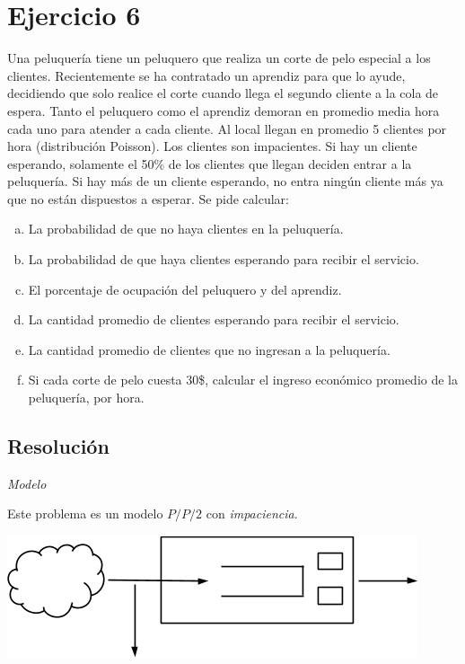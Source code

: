 \documentclass[a4paper,11pt]{article}
\begin{document}
\vspace{35pt}
\leftskip=0pt
\parindent=0pt
\section{\textbf{Ejercicio 6}}

Una peluquería tiene un peluquero que realiza un corte de pelo especial a los
clientes. Recientemente se ha contratado un aprendiz para que lo ayude,
decidiendo que solo realice el corte cuando llega el segundo cliente a la cola
de espera.  Tanto el peluquero como el aprendiz demoran en promedio media hora
cada uno para atender a cada cliente. Al local llegan en promedio 5 clientes
por hora (distribución Poisson). Los clientes son impacientes. Si hay un
cliente esperando, solamente el 50\% de los clientes que llegan deciden entrar
a la peluquería. Si hay más de un cliente esperando, no entra ningún cliente
más ya que no están dispuestos a esperar. Se pide calcular: 

\begin{enumerate}[a)]
  \item La probabilidad de que no haya clientes en la peluquería. 
  \item La probabilidad de que haya clientes esperando para recibir el
    servicio. 
  \item El porcentaje de ocupación del peluquero y del aprendiz. 
  \item La cantidad promedio de clientes esperando para recibir el servicio. 
  \item La cantidad promedio de clientes que no ingresan a la peluquería. 
  \item Si cada corte de pelo cuesta 30\$, calcular el ingreso económico
    promedio de la peluquería, por hora.
\end{enumerate}


\vspace{13pt}
\leftskip=0pt
\parindent=0pt
\subsection{\textbf{Resolución}}


\vspace{13pt}
\textit{Modelo}

\vspace{13pt}
Este problema es un modelo $P/P/2$ con \textit{impaciencia}.

\vspace{13pt}
\includegraphics[width=343pt, height=102pt, keepaspectratio=true]{TP1-Colas-fig005.png}
\end{document}
